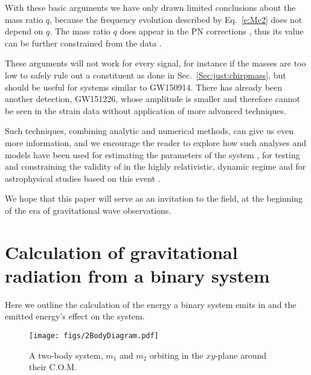 \documentclass{andp2012}%
\newcommand{\refsec}[1]{Sec.\ \ref{#1}}
\newcommand{\refeqn}[1]{Eq.\ \ref{#1}}
\def\Mc{\mathcal{M}}
\begin{document}
With these basic arguments
we have only drawn limited conclusions
about the mass ratio $q$,
because the frequency evolution
described by \refeqn{e:Mc2}
does not depend on $q$.
The mass ratio $q$ does appear
in the PN corrections \cite{EIH1938, PhysRevLett.74.3515},
thus its value can be further constrained from the data
\cite{PEPaper, BetterPE}.

These arguments will not work for every signal,
for instance if the masses are too low to safely rule out a \NS constituent
as done in \refsec{Sec:just:chirpmass},
but should be useful for systems similar to GW150914.
There has already been another \GW detection, GW151226\cite{GW151226, O1BBH},
whose amplitude is smaller and therefore cannot be seen in the strain data
without application of more advanced techniques.

Such techniques,
combining analytic and numerical methods,
can give us even more information,
and we encourage the reader to explore how
such analyses and models have been used for
estimating the parameters of the system \cite{PEPaper, BetterPE},
for testing and constraining the validity of \GR
in the highly relativistic, dynamic regime \cite{TestingGRPaper}
and for astrophysical studies based on this event \cite{AstroPaper}.

We hope that this paper will serve as an invitation to the field,
at the beginning of the era of gravitational wave observations.

\begin{acknowledgements}

\end{acknowledgements}

\appendix

\section{Calculation of gravitational radiation from a binary system}
\label{Sec:Mc from Quadrupole}
Here we outline the calculation of the energy a binary system emits in \GWs
and the emitted energy's effect on the system.

\begin{figure}[t]
\centering
\texttt{[image: figs/2BodyDiagram.pdf]}
\caption{A two-body system, $m_1$ and $m_2$ orbiting
in the $xy$-plane
around their C.O.M.
}
\label{fig:two_bodies_diagram}
\end{figure}
\end{document}
